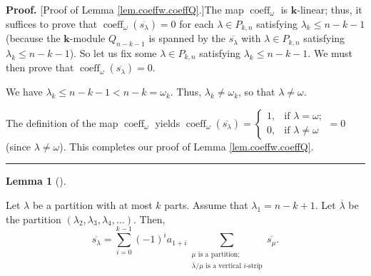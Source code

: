 \documentclass[numbers=enddot,12pt,final,onecolumn,notitlepage]{scrartcl}%
\theoremstyle{definition}
\newtheorem{lem}[theo]{Lemma}
\newenvironment{lemma}[1][]
{\begin{lem}[#1]\begin{leftbar}}
{\end{leftbar}\end{lem}}
\newenvironment{proof}[1][Proof]{\noindent\textbf{#1.} }{\ \rule{0.5em}{0.5em}}
\let\sumnonlimits\sum
\renewcommand{\sum}{\sumnonlimits\limits}
\begin{document}
\begin{proof}
[Proof of Lemma \ref{lem.coeffw.coeffQ}.]The map $\operatorname*{coeff}%
\nolimits_{\omega}$ is $\mathbf{k}$-linear; thus, it suffices to prove that
$\operatorname*{coeff}\nolimits_{\omega}\left(  \overline{s_{\lambda}}\right)
=0$ for each $\lambda\in P_{k,n}$ satisfying $\lambda_{k}\leq n-k-1$ (because
the $\mathbf{k}$-module $Q_{n-k-1}$ is spanned by the $\overline{s_{\lambda}}$
with $\lambda\in P_{k,n}$ satisfying $\lambda_{k}\leq n-k-1$). So let us fix
some $\lambda\in P_{k,n}$ satisfying $\lambda_{k}\leq n-k-1$. We must then
prove that $\operatorname*{coeff}\nolimits_{\omega}\left(  \overline
{s_{\lambda}}\right)  =0$.

We have $\lambda_{k}\leq n-k-1<n-k=\omega_{k}$. Thus, $\lambda_{k}\neq
\omega_{k}$, so that $\lambda\neq\omega$.

The definition of the map $\operatorname*{coeff}\nolimits_{\omega}$ yields
$\operatorname*{coeff}\nolimits_{\omega}\left(  \overline{s_{\lambda}}\right)
=%
\begin{cases}
1, & \text{if }\lambda=\omega;\\
0, & \text{if }\lambda\neq\omega
\end{cases}
=0$ (since $\lambda\neq\omega$). This completes our proof of Lemma
\ref{lem.coeffw.coeffQ}.
\end{proof}

\begin{lemma}
\label{lem.coeffw.0}Let $\lambda$ be a partition with at most $k$ parts.
Assume that $\lambda_{1}=n-k+1$. Let $\overline{\lambda}$ be the partition
$\left(  \lambda_{2},\lambda_{3},\lambda_{4},\ldots\right)  $. Then,
\[
\overline{s_{\lambda}}=\sum_{i=0}^{k-1}\left(  -1\right)  ^{i}a_{1+i}%
\sum_{\substack{\mu\text{ is a partition;}\\\overline{\lambda}/\mu\text{ is a
vertical }i\text{-strip}}}\overline{s_{\mu}}.
\]

\end{lemma}
\end{document}
